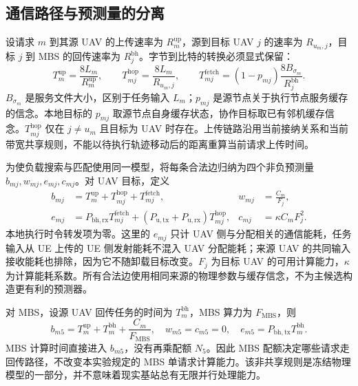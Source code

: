 \subsection{通信路径与预测量的分离}

设请求 $m$ 到其源 UAV 的上传速率为 $R_m^{\mathrm{up}}$，源到目标 UAV $j$ 的速率为 $R_{u_m,j}$，目标 $j$ 到 MBS 的回传速率为 $R_j^{\mathrm{bh}}$。字节到比特的转换必须显式保留：
\begin{equation}
 T_m^{\mathrm{up}}=\frac{8L_m}{R_m^{\mathrm{up}}},\qquad
 T_{mj}^{\mathrm{hop}}=\frac{8L_m}{R_{u_m,j}},\qquad
 T_{mj}^{\mathrm{fetch}}=(1-p_{mj})\frac{8B_{\sigma_m}}{R_j^{\mathrm{bh}}}.
 \label{eq:ch5-transfer-parts}
\end{equation}
$B_{\sigma_m}$ 是服务文件大小，区别于任务输入 $L_m$；$p_{mj}$ 是源节点关于执行节点服务缓存的信念。本地目标的 $p_{mj}$ 取源节点自身缓存状态，协作目标取已有邻机缓存信念。$T_{mj}^{\mathrm{hop}}$ 仅在 $j\ne u_m$ 且目标为 UAV 时存在。上传链路沿用当前接纳关系和当前带宽共享规则，不能以待执行轨迹移动后的距离重算当前请求上传时间。

为使负载搜索与匹配使用同一模型，将每条合法边归纳为四个非负预测量 $b_{mj},w_{mj},e_{mj},c_{mj}$。对 UAV 目标，定义
\begin{equation}
 \begin{aligned}
 b_{mj}&=T_m^{\mathrm{up}}+T_{mj}^{\mathrm{hop}}+T_{mj}^{\mathrm{fetch}},
 &w_{mj}&=\frac{C_m}{F_j},\\
 e_{mj}&=P_{\mathrm{bh,rx}}T_{mj}^{\mathrm{fetch}}
       +(P_{\mathrm{u,tx}}+P_{\mathrm{u,rx}})T_{mj}^{\mathrm{hop}},
 &c_{mj}&=\kappa C_mF_j^2.
 \end{aligned}
 \label{eq:ch5-edge-coefficients}
\end{equation}
本地执行时令转发项为零。这里的 $e_{mj}$ 只计 UAV 侧与分配相关的通信能耗，任务输入从 UE 上传的 UE 侧发射能耗不混入 UAV 分配能耗；来源 UAV 的共同输入接收能耗也排除，因为它不随卸载目标改变。$F_j$ 为目标 UAV 的可用计算能力，$\kappa$ 为计算能耗系数。所有合法边使用相同来源的物理参数与缓存信念，不为主候选构造更有利的预测器。

对 MBS，设源 UAV 回传任务的时间为 $T_m^{\mathrm{bh}}$，MBS 算力为 $F_{\mathrm{MBS}}$，则
\begin{equation}
 b_{m5}=T_m^{\mathrm{up}}+T_m^{\mathrm{bh}}+\frac{C_m}{F_{\mathrm{MBS}}},\quad
 w_{m5}=c_{m5}=0,\quad e_{m5}=P_{\mathrm{bh,tx}}T_m^{\mathrm{bh}}.
 \label{eq:ch5-mbs-coefficients}
\end{equation}
MBS 计算时间直接进入 $b_{m5}$，没有再乘配额 $N_5$。因此 MBS 配额决定哪些请求走回传路径，不改变本实验规定的 MBS 单请求计算能力。该非共享规则是冻结物理模型的一部分，并不意味着现实基站总有无限并行处理能力。

